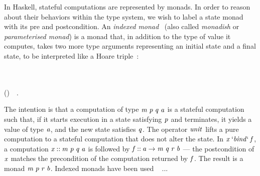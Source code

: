In Haskell, stateful computations are represented by monads. In order to
reason about their behaviors within the type system, we wish to label a state
monad with its pre and postcondition. An \emph{indexed monad}~%
\cite{indexedmonad} (also called \emph{monadish} or \emph{parameterised monad})
is a monad that, in addition to the type of value it computes, takes two more
type arguments representing an initial state and a final state, to be
interpreted like a Hoare triple~\cite{kleisli}:
\begin{hscode}\SaveRestoreHook
{}%
%
%
\>[B]{}\;\;\;\<[E]%
\\
\>[B]{}\<[5]%
\>[5]{}\mathbin{::}\to {}\;\;\;\<[E]%
\\
\>[B]{}\<[5]%
\>[5]{}\mathbin{::}\;\;\;\to (\to {}\;\;\;)\to {}\;\;\;~~.{}\<[E]%
\ColumnHook
\end{hscode}\resethooks
The intention is that a computation of type \ensuremath{\Varid{m}\;\Varid{p}\;\Varid{q}\;\Varid{a}} is a stateful computation
such that, if it starts execution in a state satisfying \ensuremath{\Varid{p}} and terminates, it
yields a value of type \ensuremath{\Varid{a}}, and the new state satisfies \ensuremath{\Varid{q}}. The operator \ensuremath{\Varid{unit}}
lifts a pure computation to a stateful computation that does not alter the
state. In \ensuremath{\Varid{x}\mathbin{`\Varid{bind}`}\Varid{f}}, a computation \ensuremath{\Varid{x}\mathbin{::}\Varid{m}\;\Varid{p}\;\Varid{q}\;\Varid{a}} is followed by
\ensuremath{\Varid{f}\mathbin{::}\Varid{a}\to \Varid{m}\;\Varid{q}\;\Varid{r}\;\Varid{b}} --- the postcondition of \ensuremath{\Varid{x}} matches the precondition of
the computation returned by \ensuremath{\Varid{f}}. The result is a monad \ensuremath{\Varid{m}\;\Varid{p}\;\Varid{r}\;\Varid{b}}.
Indexed monads have been used ~\cite{typefun,staticresources} ... 

